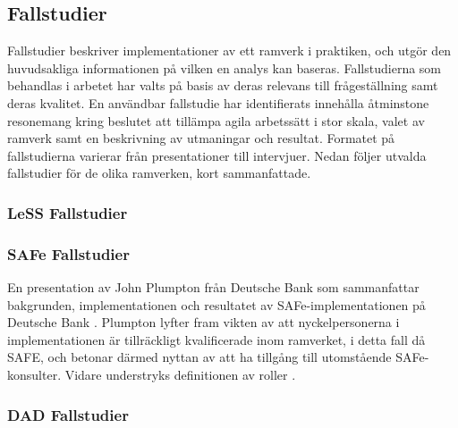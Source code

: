 		
		
		
			

	
	\subsection{Fallstudier}

		Fallstudier beskriver implementationer av ett ramverk i praktiken, och utgör den huvudsakliga informationen på vilken en analys kan baseras.
		Fallstudierna som behandlas i arbetet har valts på basis av deras relevans till frågeställning samt deras kvalitet. En användbar fallstudie har identifierats innehålla åtminstone resonemang kring beslutet att tillämpa agila arbetssätt i stor skala, valet av ramverk samt en beskrivning av utmaningar och resultat. Formatet på fallstudierna varierar från presentationer till intervjuer.
		Nedan följer utvalda fallstudier för de olika ramverken, kort sammanfattade.

		
		
		\subsubsection{LeSS Fallstudier}

			
			

		
		\subsubsection{SAFe Fallstudier}

			En presentation av John Plumpton från Deutsche Bank som sammanfattar bakgrunden, implementationen och resultatet av SAFe-implementationen på Deutsche Bank \cite{deutsche_case}. 
			Plumpton lyfter fram vikten av att nyckelpersonerna i implementationen är tillräckligt kvalificerade inom ramverket, i detta fall då SAFE, och betonar därmed nyttan av att ha tillgång till utomstående SAFe-konsulter. 
			Vidare understryks definitionen av roller .
			
			
			
		
		\subsubsection{DAD Fallstudier}
		
